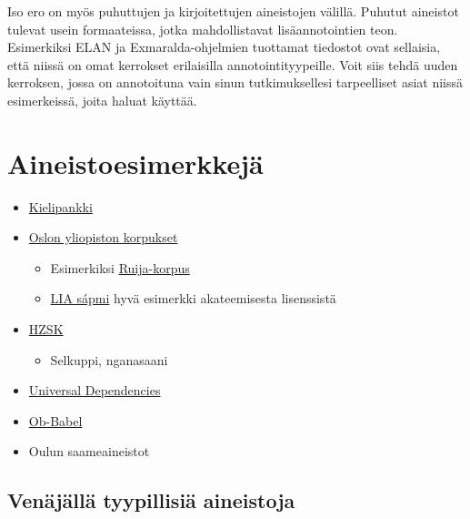 \documentclass[]{book}
\providecommand{\tightlist}{%
  \setlength{\itemsep}{0pt}\setlength{\parskip}{0pt}}
\begin{document}
Iso ero on myös puhuttujen ja kirjoitettujen aineistojen välillä.
Puhutut aineistot tulevat usein formaateissa, jotka mahdollistavat
lisäannotointien teon. Esimerkiksi ELAN ja Exmaralda-ohjelmien tuottamat
tiedostot ovat sellaisia, että niissä on omat kerrokset erilaisilla
annotointityypeille. Voit siis tehdä uuden kerroksen, jossa on
annotoituna vain sinun tutkimuksellesi tarpeelliset asiat niissä
esimerkeissä, joita haluat käyttää.

\hypertarget{aineistoesimerkkeja}{%
\section{Aineistoesimerkkejä}\label{aineistoesimerkkeja}}

\begin{itemize}
\tightlist
\item
  \href{https://www.kielipankki.fi/}{Kielipankki}
\item
  \href{https://www.hf.uio.no/iln/english/about/organization/text-laboratory/services/index.html\#speech}{Oslon
  yliopiston korpukset}

  \begin{itemize}
  \tightlist
  \item
    Esimerkiksi
    \href{http://tekstlab.uio.no/glossa/html/index_dev.php?corpus=ruija}{Ruija-korpus}
  \item
    \href{https://tekstlab.uio.no/glossa2/saami}{LIA sápmi} hyvä
    esimerkki akateemisesta lisenssistä
  \end{itemize}
\item
  \href{https://corpora.uni-hamburg.de/hzsk/}{HZSK}

  \begin{itemize}
  \tightlist
  \item
    Selkuppi, nganasaani
  \end{itemize}
\item
  \href{http://universaldependencies.org/}{Universal Dependencies}
\item
  \href{http://www.babel.gwi.uni-muenchen.de/}{Ob-Babel}
\item
  Oulun saameaineistot
\end{itemize}

\hypertarget{venajalla-tyypillisia-aineistoja}{%
\subsection{Venäjällä tyypillisiä
aineistoja}\label{venajalla-tyypillisia-aineistoja}}
\end{document}
